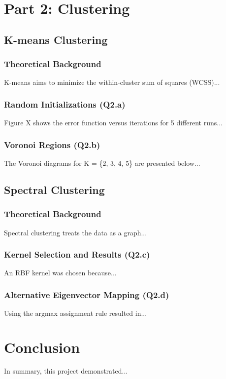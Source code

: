 \documentclass[12pt, a4paper]{article}
\begin{document}
\section{Part 2: Clustering}

    \subsection{K-means Clustering}
        \subsubsection{Theoretical Background}
        K-means aims to minimize the within-cluster sum of squares (WCSS)...
        
        \subsubsection{Random Initializations (Q2.a)}
        Figure X shows the error function versus iterations for 5 different runs...
        
        \subsubsection{Voronoi Regions (Q2.b)}
        The Voronoi diagrams for K = \{2, 3, 4, 5\} are presented below...

    \subsection{Spectral Clustering}
        \subsubsection{Theoretical Background}
        Spectral clustering treats the data as a graph...
        
        \subsubsection{Kernel Selection and Results (Q2.c)}
        An RBF kernel was chosen because...
        
        \subsubsection{Alternative Eigenvector Mapping (Q2.d)}
        Using the argmax assignment rule resulted in...

\section{Conclusion}
In summary, this project demonstrated...
\end{document}
